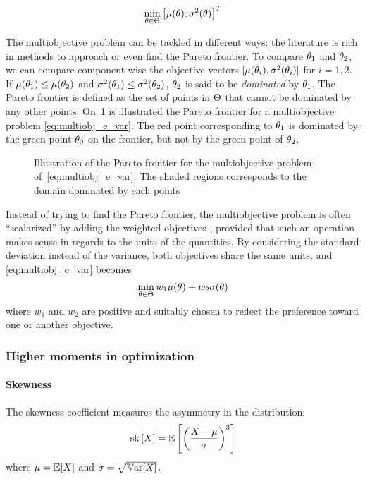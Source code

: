 \documentclass[../../Main_ManuscritThese.tex]{subfiles}
\newcommand\imgpath{/home/victor/acadwriting/Manuscrit/Text/Chapter3/img/}
\begin{document}
\begin{align}
  \label{eq:multiobj_e_var}
  \min_{\theta\in\Theta} \left[\mu(\theta),\sigma^2(\theta)\right]^T
\end{align}

The multiobjective problem can be tackled in different ways: the literature is rich in methods to approach or even find the Pareto frontier. To compare $\theta_1$ and $\theta_2$, we can compare component wise the objective vectors $[\mu(\theta_i),\sigma^2(\theta_i)]$ for $i=1,2$. If $\mu(\theta_1) \leq \mu(\theta_2)$ and $\sigma^2(\theta_1) \leq \sigma^2(\theta_2)$, $\theta_2$ is said to be \emph{dominated} by $\theta_1$. The Pareto frontier is defined as the set of points in $\Theta$ that cannot be dominated by any other points.
On~\cref{fig:pareto} is illustrated the Pareto frontier for a multiobjective problem \cref{eq:multiobj_e_var}. The red point corresponding to $\theta_1$ is dominated by the green point $\theta_0$ on the frontier, but not by the green point of $\theta_2$.

\begin{figure}[ht]
  \label{fig:pareto} 
  \centering
  
  \caption{Illustration of the Pareto frontier for the multiobjective problem of~\cref{eq:multiobj_e_var}. The shaded regions corresponds to the domain dominated by each points}
\end{figure}

Instead of trying to find the Pareto frontier, the multiobjective problem is often ``scalarized'' by adding the weighted objectives \cite{marler_weighted_2010}, provided that such an operation makes sense in regards to the units of the quantities. By considering the standard deviation instead of the variance, both objectives share the same units, and \cref{eq:multiobj_e_var} becomes
\begin{equation}
  \min_{\theta\in\Theta} w_1\mu(\theta) + w_2\sigma(\theta)
\end{equation}
where $w_1$ and $w_2$ are positive and suitably chosen to reflect the preference toward one or another objective.

\subsubsection{Higher moments in optimization}

\paragraph{Skewness}
The skewness coefficient measures the asymmetry in the distribution:
\begin{equation}
  \mathrm{sk}\left[X\right] = \mathbb{E}\left[\left(\frac{X - \mu}{\sigma}\right)^3\right]
\end{equation}
where $\mu = \mathbb{E}[X]$ and $\sigma = \sqrt{\mathbb{V}\mathrm{ar}[X]}$.
\end{document}
